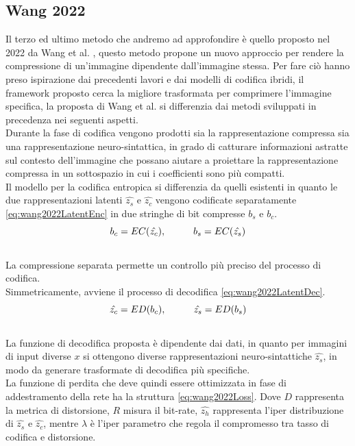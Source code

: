 \subsection{Wang 2022}
Il terzo ed ultimo metodo che andremo ad approfondire è quello proposto nel 2022 da Wang et al. \cite{wang2022neural}, questo metodo propone un nuovo approccio per rendere la compressione di un’immagine dipendente dall’immagine stessa. Per fare ciò hanno preso ispirazione dai precedenti lavori e dai modelli di codifica ibridi, il framework proposto cerca la migliore trasformata per comprimere l’immagine specifica, la proposta di Wang et al. si differenzia dai metodi sviluppati in precedenza nei seguenti aspetti.\\
Durante la fase di codifica vengono prodotti sia la rappresentazione compressa sia una rappresentazione neuro-sintattica, in grado di catturare informazioni astratte sul contesto dell’immagine che possano aiutare a proiettare la rappresentazione compressa in un sottospazio in cui i coefficienti sono più compatti.\\
Il modello per la codifica entropica si differenzia da quelli esistenti in quanto le due rappresentazioni latenti $\hat{z_{s}}$ e $\hat{z_ {c}}$ vengono codificate separatamente \ref{eq:wang2022LatentEnc} in due stringhe di bit compresse $b_{s}$ e $b_{c}$.\\
\begin{equation}\label{eq:wang2022LatentEnc}
    b_{c} = EC (\hat{z_{c}}), \hspace{1 cm} b_{s} =  EC (\hat{z_{s}})
\end{equation}\\
La compressione separata permette un controllo più preciso del processo di codifica.\\
Simmetricamente, avviene il processo di decodifica \ref{eq:wang2022LatentDec}.\\
\begin{equation}\label{eq:wang2022LatentDec}
    \hat{z_{c}} =  ED (b_{c}), \hspace{1 cm} \hat{z_{s}} =  ED (b_{s}) 
\end{equation}\\
La funzione di decodifica proposta è dipendente dai dati, in quanto per immagini di input diverse $x$ si ottengono diverse rappresentazioni neuro-sintattiche $\hat{z_ {s}}$, in modo da generare trasformate di decodifica più specifiche.\\
La funzione di perdita che deve quindi essere ottimizzata in fase di addestramento della rete ha la struttura \ref{eq:wang2022Loss}. Dove $D$ rappresenta la metrica di distorsione, $R$ misura il bit-rate, $\hat{z_{h}}$ rappresenta l’iper distribuzione di $\hat{z_{s}}$ e $\hat{z_{c}}$, mentre $\lambda$ è l’iper parametro che regola il compromesso tra tasso di codifica e distorsione.\\
